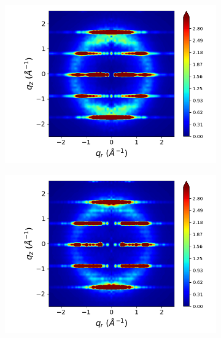 \documentclass[journal=jpcbfk,manusciprt=article]{achemso}
\begin{document}
\begin{figure}[!htb]
\begin{subfigure}{0.3\linewidth}
  	\label{fig:staggered_rzplot_restrained}
  \end{subfigure}
  \begin{subfigure}{0.3\linewidth}
  	\centering
  	\includegraphics[width=\textwidth]{rotated_monomers_rzplot_restrained.png}
  	\label{fig:rotated_monomers_rzplot_restrained}
  \end{subfigure}
  \begin{subfigure}{0.3\linewidth}
  	\centering
  	\includegraphics[width=\textwidth]{solvated_pore_rzplot_restrained.png}
  	\label{fig:solvated_pore_rzplot_restrained}
  \end{subfigure}

\end{figure}
\end{document}
